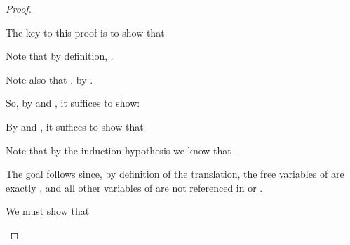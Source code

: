 \begin{proof}
\begin{proofcases}
    The key to this proof is to show that



    Note that by definition, .

    Note also that
    ,
    by .

    So, by  and , it suffices to show:


    By  and , it suffices to show that


      Note that by the induction hypothesis we know that
      \im{\pcctyjudg{\pcclenv,\pccx:\cctrans{\sA}}{\cctrans{\se}}{\cctrans{\sB}}}.

      The goal follows since, by definition of the translation, the free
      variables of \im{\cctrans{\se}} are exactly ,
      and all other variables of \im{\pcclenv} are not referenced in
      \im{\cctrans{\se}} or \im{\cctrans{\sB}}.

    \item {}

    We must show that
    \im{\pcctyjudg{\pcclenv}{\cctrans{(\sappe{\se}{\sepr})}}{\cctrans{(\subst{\sB}{\sepr}{\sx})}}}


\end{proofcases}
\end{proof}
